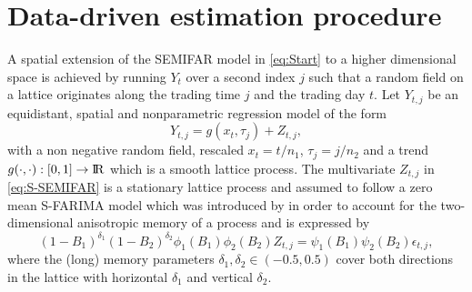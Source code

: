 \documentclass[12pt]{article}
\begin{document}
\section{Data-driven estimation procedure} 
A spatial extension of the SEMIFAR model in \eqref{eq:Start} to a higher dimensional space is achieved 
by running \(Y_{t}\) over a second index \(j\) such that a random field on a lattice originates along the trading time \(j\) and the trading day \(t\).   
Let \(Y_{t,j}\) be an equidistant, spatial and nonparametric regression model of the form
\begin{equation}
\label{eq:S-SEMIFAR}
Y_{t,j} = g(x_{t},\tau_{j}) + Z_{t,j},
\end{equation} 
with a non negative random field, rescaled \(x_t = t/n_1\), \(\tau_j = j/n_2\) and a trend \(g(\cdot,\cdot) : [0,1] \rightarrow {\rm I\!R} \) which is a smooth lattice process.
The multivariate \(Z_{t,j}\) in \eqref{eq:S-SEMIFAR} is a stationary lattice process and assumed to follow a zero mean S-FARIMA model 
which was introduced by \textcite{beran2009least} in order to account for the two-dimensional anisotropic memory of a process and is expressed by 
%
\begin{equation} 
\label{eq:S-FARIMA}
		(1-B_1)^{\delta_1} (1-B_2)^{\delta_2} \phi_1(B_1) \phi_2(B_2) Z_{t,j} = \psi_1(B_1) \psi_2(B_2)  \epsilon_{t,j},
\end{equation}
where the (long) memory parameters \(\delta_1,\delta_2 \in (-0.5,0.5) \) cover both directions in the lattice with horizontal \( \delta_1 \)  and vertical \( \delta_2 \).
\end{document}
